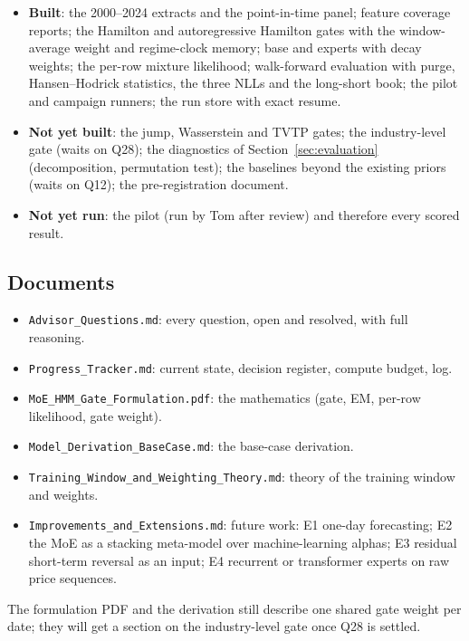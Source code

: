 \begin{itemize}
\item \textbf{Built}: the 2000--2024 extracts and the point-in-time panel; feature coverage reports; the
  Hamilton and autoregressive Hamilton gates with the window-average weight and regime-clock memory;
  base and experts with decay weights; the per-row mixture likelihood; walk-forward evaluation with
  purge, Hansen--Hodrick statistics, the three NLLs and the long-short book; the pilot and campaign
  runners; the run store with exact resume.
\item \textbf{Not yet built}: the jump, Wasserstein and TVTP gates; the industry-level gate (waits on Q28);
  the diagnostics of Section~\ref{sec:evaluation} (decomposition, permutation test); the baselines beyond
  the existing priors (waits on Q12); the pre-registration document.
\item \textbf{Not yet run}: the pilot (run by Tom after review) and therefore every scored result.
\end{itemize}

\subsection{Documents}

\begin{itemize}
\item \texttt{Advisor\_Questions.md}: every question, open and resolved, with full reasoning.
\item \texttt{Progress\_Tracker.md}: current state, decision register, compute budget, log.
\item \texttt{MoE\_HMM\_Gate\_Formulation.pdf}: the mathematics (gate, EM, per-row likelihood, gate weight).
\item \texttt{Model\_Derivation\_BaseCase.md}: the base-case derivation.
\item \texttt{Training\_Window\_and\_Weighting\_Theory.md}: theory of the training window and weights.
\item \texttt{Improvements\_and\_Extensions.md}: future work: E1 one-day forecasting; E2 the MoE as a stacking
  meta-model over machine-learning alphas; E3 residual short-term reversal as an input; E4 recurrent or transformer
  experts on raw price sequences.
\end{itemize}
The formulation PDF and the derivation still describe one shared gate weight per date; they will get a
section on the industry-level gate once Q28 is settled.
